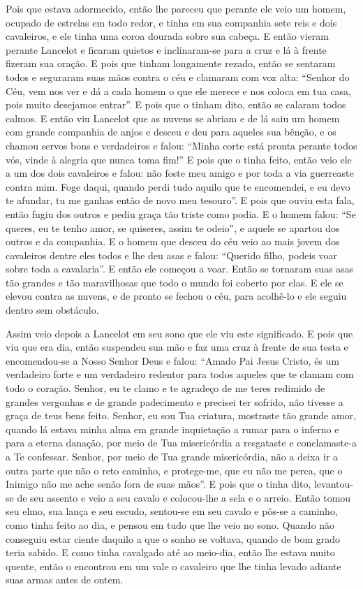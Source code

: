 Pois que estava adormecido, então lhe pareceu que perante ele veio um homem,
ocupado de estrelas em todo redor, e tinha em sua companhia sete reis e dois
cavaleiros, e ele tinha uma coroa dourada sobre sua cabeça. E então vieram
perante Lancelot e ficaram quietos e inclinaram-se para a cruz e lá à frente
fizeram sua oração. E pois que tinham longamente rezado, então se sentaram
todos e seguraram suas mãos contra o céu e clamaram com voz alta: “Senhor do
Céu, vem nos ver e dá a cada homem o que ele merece e nos coloca em tua casa,
pois muito desejamos entrar”. E pois que o tinham dito, então se calaram todos
calmos. E então viu Lancelot que as nuvens se abriam e de lá saiu um homem com
grande companhia de anjos e desceu e deu para aqueles sua bênção, e os chamou
servos bons e verdadeiros e falou: ``Minha corte está pronta perante todos vós,
vinde à alegria que nunca toma fim!” E pois que o tinha feito, então veio ele
a um dos dois cavaleiros e falou: não foste meu amigo e por toda a via
guerreaste contra mim. Foge daqui, quando perdi tudo aquilo que te encomendei,
e eu devo te afundar, tu me ganhas então de novo meu tesouro”. E pois que ouviu
esta fala, então fugiu dos outros e pediu graça tão triste como podia. E o
homem falou: “Se queres, eu te tenho amor, se quiseres, assim te odeio”, e
aquele se apartou dos outros e da companhia. E o homem que desceu do céu veio
ao mais jovem dos cavaleiros dentre eles todos e lhe deu asas e falou: “Querido
filho, podeis voar sobre toda a cavalaria”. E então ele começou a voar. Então
se tornaram suas asas tão grandes e tão maravilhosas que todo o mundo foi
coberto por elas. E ele se elevou contra as nuvens, e de pronto se fechou o
céu, para acolhê-lo e ele seguiu dentro sem obstáculo. 

Assim veio depois a Lancelot em seu sono que ele viu este significado. E
pois que viu que era dia, então suspendeu sua mão e faz uma cruz à frente de
sua testa e encomendou-se a Nosso Senhor Deus e falou: “Amado Pai Jesus Cristo,
és um verdadeiro forte e um verdadeiro redentor para todos aqueles que te
clamam com todo o coração. Senhor, eu te clamo e te agradeço de me teres
redimido de grandes vergonhas e de grande padecimento e precisei ter sofrido,
não tivesse a graça de teus bens feito. Senhor, eu sou Tua criatura, mostraste
tão grande amor, quando lá estava minha alma em grande inquietação a rumar para
o inferno e para a eterna danação, por meio de Tua misericórdia a resgataste e
conclamaste-a a Te confessar. Senhor, por meio de Tua grande misericórdia, não
a deixa ir a outra parte que não o reto caminho, e protege-me, que eu não me
perca, que o Inimigo não me ache senão fora de suas mãos”. E pois que o tinha
dito, levantou-se de seu assento e veio a seu cavalo e colocou-lhe a sela e o
arreio. Então tomou seu elmo, sua lança e seu escudo, sentou-se em seu cavalo e
pôs-se a caminho, como tinha feito ao dia, e pensou em tudo que lhe veio no
sono. Quando não conseguiu estar ciente daquilo a que o sonho se voltava,
quando de bom grado teria sabido. E como tinha cavalgado até ao meio-dia, então
lhe estava muito quente, então o encontrou em um vale o cavaleiro que lhe tinha
levado adiante suas armas antes de ontem.

